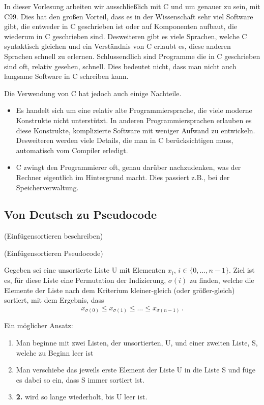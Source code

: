 In dieser Vorlesung arbeiten wir ausschließlich mit C und um genauer zu sein, mit C99.
Dies hat den großen Vorteil, dass es in der Wissenschaft sehr viel Software gibt, die entweder in C geschrieben ist oder auf Komponenten aufbaut, die wiederum in C geschrieben sind.
Desweiteren gibt es viele Sprachen, welche C syntaktisch gleichen und ein Verständnis von C erlaubt es, diese anderen Sprachen schnell zu erlernen.
Schlussendlich sind Programme die in C geschrieben sind oft, relativ gesehen, schnell.
Dies bedeutet nicht, dass man nicht auch langsame Software in C schreiben kann.

Die Verwendung von C hat jedoch auch einige Nachteile.
\begin{itemize}
 \item{Es handelt sich um eine relativ alte Programmiersprache, die viele moderne Konstrukte nicht unterstützt. In anderen Programmiersprachen erlauben es diese Konstrukte, komplizierte Software mit weniger Aufwand zu entwickeln. Desweiteren werden viele Details, die man in C berücksichtigen muss, automatisch vom Compiler erledigt.}
 \item{C zwingt den Programmierer oft, genau darüber nachzudenken, was der Rechner eigentlich im Hintergrund macht. Dies passiert z.B., bei der Speicherverwaltung.}
\end{itemize}

\subsection{Von Deutsch zu Pseudocode}

\iflecturer
\begin{framed}
  
  \blackboard{} (Einfügensortieren beschreiben)
  
  \slide{} (Einfügensortieren Pseudocode)
\end{framed}
\fi

Gegeben sei eine unsortierte Liste U mit Elementen ${x_i}$, $i \in \lbrace 0,\ldots, n-1 \rbrace$.
Ziel ist es, für diese Liste eine Permutation der Indizierung, $\sigma(i)$ zu finden, welche die Elemente der Liste nach dem Kriterium kleiner-gleich (oder größer-gleich) sortiert, mit dem Ergebnis, dass
\begin{equation*}
  x_{\sigma(0)} \leq x_{\sigma(1)} \leq \ldots \leq x_{\sigma(n-1)} \, .
\end{equation*}

Ein möglicher Ansatz:
\begin{enumerate}
 \item{Man beginne mit zwei Listen, der unsortierten, U, und einer zweiten Liste, S, welche zu Beginn leer ist}
 \item{Man verschiebe das jeweils erste Element der Liste U in die Liste S und füge es dabei so ein, dass S immer sortiert ist.}
 \item{\textbf{2.} wird so lange wiederholt, bis U leer ist.}
\end{enumerate}

